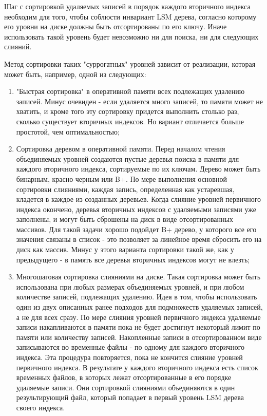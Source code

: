 \documentclass[a4paper,hidelinks,12pt]{article}
\begin{document}
Шаг с сортировкой удаляемых записей в порядок каждого вторичного индекса
необходим для того, чтобы соблюсти инвариант LSM дерева, согласно которому
его уровни на диске должны быть отсортированы по его ключу. Иначе использовать
такой уровень будет невозможно ни для поиска, ни для следующих слияний.

Метод сортировки таких "суррогатных" уровней зависит от реализации, которая
может быть, например, одной из следующих:
\begin{enumerate}
\item "Быстрая сортировка" в оперативной памяти всех подлежащих удалению
записей. Минус очевиден - если удаляется много записей, то памяти может не
хватить, и кроме того эту сортировку придется выполнить столько раз, сколько
существует вторичных индексов. Но вариант отличается больше простотой, чем
оптимальностью;
\item Сортировка деревом в оперативной памяти. Перед началом чтения объединяемых
уровней создаются пустые деревья поиска в памяти для каждого вторичного индекса,
сортируемые по их ключам. Дерево может быть бинарным, красно-черным или B+.
По мере выполнения основной сортировки слияниями, каждая запись, определенная
как устаревшая, кладется в каждое из созданных деревьев. Когда слияние уровней
первичного индекса окончено, деревья вторичных индексов с удаляемыми записями
уже заполнены, и могут быть сброшены на диск в виде отсортированных массивов.
Для такой задачи хорошо подойдет B+ дерево, у которого все его значения связаны
в список - это позволяет за линейное время сбросить его на диск как массив.
Минус у этого варианта сортировки такой же, как у предыдущего - в память все
деревья вторичных индексов могут не влезть;
\item Многошаговая сортировка слияниями на диске. Такая сортировка может быть
использована при любых размерах объединяемых уровней, и при любом количестве
записей, подлежащих удалению. Идея в том, чтобы использовать один из двух
описанных ранее подходов для подмножеств удаляемых записей, а не для всех сразу.
По мере слияния уровней первичного индекса удаляемые записи накапливаются в
памяти пока не будет достигнут некоторый лимит по памяти или количеству записей.
Накопленные записи в отсортированном виде записываются во временные файлы - по
одному для каждого вторичного индекса. Эта процедура повторяется, пока не
кончится слияние уровней первичного индекса. В результате у каждого вторичного
индекса есть список временных файлов, в которых лежат отсортированные в его
порядке удаляемые записи. Они сортировкой слияниями объединяются в один
результирующий файл, который попадает в первый уровень LSM дерева своего
индекса.
\end{enumerate}
\end{document}
